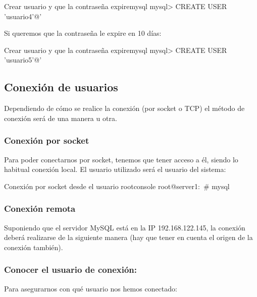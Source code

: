 \begin{mycode}{Crear usuario y que la contraseña expire}{mysql}{{\small }}
mysql> CREATE USER 'usuario4'@'%
\end{mycode}

Si queremos que la contraseña le expire en 10 días:

\begin{mycode}{Crear usuario y que la contraseña expire}{mysql}{{\scriptsize}}
mysql> CREATE USER 'usuario5'@'%
\end{mycode}



\subsection{Conexión de usuarios}
Dependiendo de cómo se realice la conexión (por socket o TCP) el método de conexión será de una manera u otra.


\subsubsection*{Conexión por socket}
Para poder conectarnos por socket, tenemos que tener acceso a él, siendo lo habitual conexión local. El usuario utilizado será el usuario del sistema:

\begin{mycode}{Conexión por socket desde el usuario root}{console}{}
root@server1:~# mysql
\end{mycode}


\subsubsection*{Conexión remota}
Suponiendo que el servidor MySQL está en la IP 192.168.122.145, la conexión deberá realizarse de la siguiente manera (hay que tener en cuenta el origen de la conexión también).



\subsubsection*{Conocer el usuario de conexión:}
Para asegurarnos con qué usuario nos hemos conectado:

